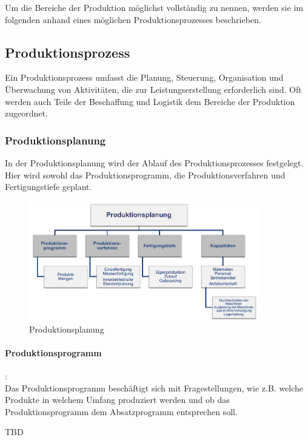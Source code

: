 \documentclass[a4paper,12pt, german]{report}
\begin{document}
Um die Bereiche der Produktion möglichst vollständig zu nennen, werden sie im folgenden anhand eines möglichen Produktionsprozesses beschrieben. 

\subsection{Produktionsprozess}

Ein Produktionsprozess umfasst die Planung, Steuerung, Organisation und Überwachung von Aktivitäten, die zur Leistungserstellung erforderlich sind. 
Oft werden auch Teile der Beschaffung und Logistik dem Bereiche der Produktion zugeordnet. 

\subsubsection{Produktionsplanung}

In der Produktionsplanung wird der Ablauf des Produktionsprozesses festgelegt. Hier wird sowohl das Produktionsprogramm, die Produktionsverfahren und Fertigungstiefe geplant.

\begin{figure}[H]
  \center
 \includegraphics[width=10cm]{images/Produktionsplanung.png}
  \caption[Produktionsplanung]{Produktionsplanung \cite{07}}
\end{figure}



\paragraph{Produktionsprogramm}: $ $ \\ Das Produktionsprogramm beschäftigt sich mit Fragestellungen, wie z.B. welche Produkte in welchem Umfang produziert werden und ob das Produktionsprogramm dem Absatzprogramm entsprechen soll. 

TBD


\end{document}
